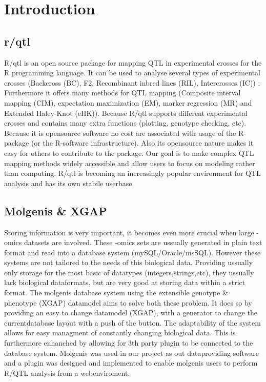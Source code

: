 \section{Introduction}
\subsection{r/qtl}
R/qtl is an open source package for mapping QTL in experimental crosses for the R programming language\cite{broman09}\cite{broman03}.
It can be used to analyse several types of experimental crosses (Backcross (BC), F2, Recombinant inbred lines (RIL), Intercrosses (IC)) 
. Furthermore it offers many methods for QTL mapping (Composite interval mapping (CIM), expectation maximization (EM), marker regression (MR) and 
Extended Haley-Knot (eHK)). Because R/qtl supports different experimental crosses and contains many extra functions (plotting, genotype checking, etc).
Because it is opensource software no cost are associated with usage of the R-package (or the R-software infrastructure). Also its opensource nature
 makes it easy for others to contribute to the package. 
Our goal is to make complex QTL mapping methods widely accessible and allow users to focus on modeling rather than computing. R/qtl 
is becoming an increasingly popular environment for QTL analysis and has its own stabile userbase\cite{broman03}.
\subsection{Molgenis \& XGAP}
Storing information is very important, it becomes even more crucial when large -omics datasets are involved. These -omics sets are ussually generated 
in plain text format and read into a database system (mySQL/Oracle/msSQL). However these systems are not tailored to the needs of this biological data.
Providing ussually only storage for the most basic of datatypes (integers,strings,etc), they ussually lack biological dataformats, but are very good 
at storing data within a strict format. The molgenis database system using the extensible genotype \& phenotype (XGAP) datamodel aims to solve both these problem.
It does so by providing an easy to change datamodel (XGAP), with a generator to change the currentdatabase layout with a push of the button. The adaptability
of the system allows for easy managment of constantly changing biological data. This is furthermore enhanched by allowing for 3th party plugin to be 
connected to the database system. Molgenis was used in our project as out dataproviding software and a plugin was designed and implemented to enable 
molgenis users to perform R/QTL analysis from a webenviroment.
